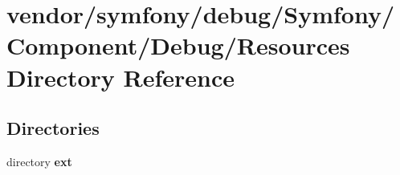\section{vendor/symfony/debug/\+Symfony/\+Component/\+Debug/\+Resources Directory Reference}
\label{dir_1783ad80794237b1eb3c34c65fec9485}
\subsection*{Directories}
\begin{DoxyCompactItemize}
\item 
directory {\bf ext}
\end{DoxyCompactItemize}
